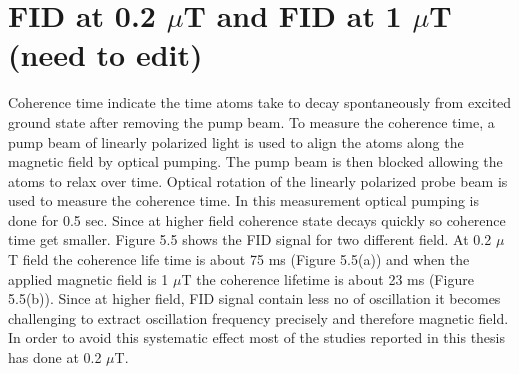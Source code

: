    \section{FID at 0.2 $\mu$T and FID at 
  1 $\mu$T (need to edit) }
  Coherence time indicate the time atoms take to decay spontaneously from excited ground state after removing the pump beam. To measure the coherence time, a pump beam of linearly polarized light is
used to align the atoms along the magnetic field by optical pumping. The pump
beam is then blocked allowing the atoms to relax over time. Optical rotation of the linearly polarized probe beam is used to measure the coherence time. In this measurement optical pumping is done for 0.5 sec. Since at higher field coherence state decays quickly so coherence time get smaller. Figure 5.5 shows the FID signal for  two different field.  At 0.2 $\mu$T field the coherence life time is about 75 ms (Figure 5.5(a)) and when the applied magnetic field is 1 $\mu$T  the coherence lifetime is about 23 ms (Figure 5.5(b)). Since at higher field, FID signal contain less no of oscillation it becomes challenging to extract oscillation frequency precisely and therefore magnetic field. In order to avoid this systematic effect most of the studies reported in this thesis has done at 0.2 $\mu$T.
